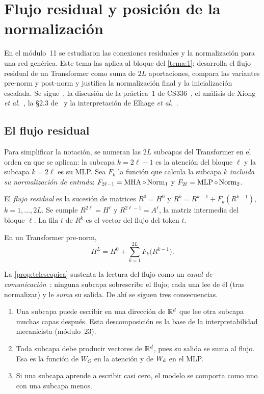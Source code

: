 \chapter{Flujo residual y posición de la normalización}
\label{tema:2}

En el módulo~11 se estudiaron las conexiones residuales y la normalización para una red genérica. Este tema las aplica al bloque del \cref{tema:1}: desarrolla el flujo residual de un Transformer como suma de $2L$ aportaciones, compara las variantes pre-norm y post-norm y justifica la normalización final y la inicialización escalada. Se sigue~\cite[§7.2]{jm3}, la discusión de la práctica~1 de CS336~\cite[§3.4]{cs336}, el análisis de Xiong \emph{et al.}~\cite{xiong}, la §2.3 de~\cite{gpt2} y la interpretación de Elhage \emph{et al.}~\cite{elhage}.

\section{El flujo residual}

Para simplificar la notación, se numeran las $2L$ subcapas del Transformer en el orden en que se aplican: la subcapa $k=2\ell-1$ es la atención del bloque $\ell$ y la subcapa $k=2\ell$ es su MLP. Sea $F_k$ la función que calcula la subcapa $k$ \emph{incluida su normalización de entrada}: $F_{2\ell-1}=\operatorname{MHA}\circ\operatorname{Norm}_1$ y $F_{2\ell}=\operatorname{MLP}\circ\operatorname{Norm}_2$.

\begin{definicion}\label{def:flujo}
El \emph{flujo residual} es la sucesión de matrices $R^{0}=H^{0}$ y $R^{k}=R^{k-1}+F_k(R^{k-1})$, $k=1,\dots,2L$. Se cumple $R^{2\ell}=H^{\ell}$ y $R^{2\ell-1}=A^{\ell}$, la matriz intermedia del bloque $\ell$. La fila $t$ de $R^{k}$ es el vector del flujo del token $t$.
\end{definicion}

\begin{proposicion}\label{prop:telescopica}
En un Transformer pre-norm,
\[
H^{L}=H^{0}+\sum_{k=1}^{2L}F_k\bigl(R^{k-1}\bigr).
\]
\end{proposicion}

La \cref{prop:telescopica} sustenta la lectura del flujo como un \emph{canal de comunicación}~\cite{elhage}: ninguna subcapa sobrescribe el flujo; cada una lee de él (tras normalizar) y le \emph{suma} su salida. De ahí se siguen tres consecuencias.
\begin{enumerate}
  \item Una subcapa puede escribir en una dirección de $\mathbb{R}^{d}$ que lee otra subcapa muchas capas después. Esta descomposición es la base de la interpretabilidad mecanicista (módulo~23).
  \item Toda subcapa debe producir vectores de $\mathbb{R}^{d}$, pues su salida se suma al flujo. Esa es la función de $W_O$ en la atención y de $W_{\mathrm{d}}$ en el MLP.
  \item Si una subcapa aprende a escribir casi cero, el modelo se comporta como uno con una subcapa menos.
\end{enumerate}


